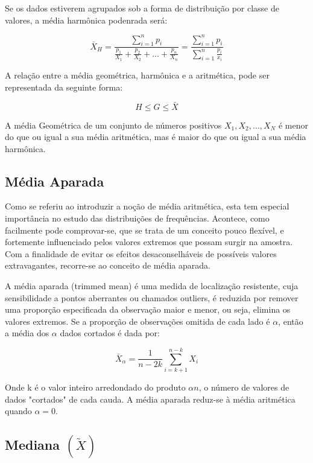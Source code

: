 Se os dados estiverem agrupados sob a forma de distribuição por classe de valores, a média harmônica podenrada será:


\begin{equation}\label{harmonicapondrada}
    \bar{X}_{H}=\frac{\sum_{i=1}^{n}p_{i}}{\frac{p_{1}}{X_{1}}+\frac{p_{2}}{X_{2}}+\ldots+\frac{p_{n}}{X_{n}}}=\frac{\sum_{i=1}^{n}p_{i}}{\sum_{i=1}^{n}\frac{p_{i}}{x_{i}}}
\end{equation}


A relação entre a média geométrica, harmônica e a aritmética, pode ser representada da seguinte forma:

        $$ H \leq G \leq \bar{X}  $$

A média Geométrica de um conjunto de números positivos $X_{1},X_{2},\ldots,X_{N}$ é menor do que ou igual a sua média aritmética, mas é maior do que ou igual a sua média harmônica.


\subsection{Média Aparada}


\inic Como se referiu ao introduzir a noção de média aritmética, esta tem especial
importância no estudo das distribuições de frequências.
Acontece, como facilmente pode comprovar-se, que se trata de um conceito
pouco flexível, e fortemente influenciado pelos valores extremos que possam surgir na
amostra. Com a finalidade de evitar os efeitos desaconselháveis de possíveis valores
extravagantes, recorre-se ao conceito de média aparada. \vskip0.3cm


A média aparada (trimmed mean) é uma medida de localização resistente, cuja sensibilidade a pontos aberrantes ou chamados outliers, é reduzida por remover uma proporção especificada da observação maior e menor, ou seja, elimina os valores extremos. Se a proporção de observações omitida de cada lado é $\alpha$, então a média dos $\alpha$ dados cortados é dada por:

\begin{equation}\label{aparada}
    \bar{X}_{\alpha}=\frac{1}{n-2k}\sum_{i=k+1}^{n-k}X_{i}
\end{equation}

Onde k é o valor inteiro arredondado do produto $\alpha n$, o número de valores de dados "cortados" de cada cauda. A média aparada reduz-se à média aritmética quando $\alpha = 0$.


\subsection{Mediana $(\widetilde{X})$}


